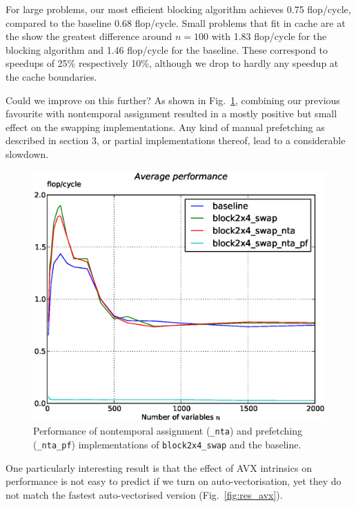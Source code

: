 \documentclass[letterpaper]{article}
\begin{document}
For large problems, our most efficient blocking algorithm achieves 0.75 flop/cycle, compared to the baseline 0.68 flop/cycle.
Small problems that fit in cache are at the show the greatest difference around $n=100$ with 1.83 flop/cycle for the blocking algorithm and 1.46 flop/cycle for the baseline.
These correspond to speedups of 25\% respectively 10\%, although we drop to hardly any speedup at the cache boundaries.

Could we improve on this further?
As shown in Fig.~\ref{fig:res_cachecontrol}, combining our previous favourite with nontemporal assignment resulted in a mostly positive but small effect on the swapping implementations.
Any kind of manual prefetching as described in section 3, or partial implementations thereof, lead to a considerable slowdown.

\begin{figure}\centering
  \includegraphics[scale=0.4]{img/results_cachecontrol_novec.eps}
  \caption{Performance of nontemporal assignment ({\tt \_nta}) and prefetching ({\tt \_nta\_pf}) implementations of {\tt block2x4\_swap} and the baseline.\label{fig:res_cachecontrol}}
\end{figure}

One particularly interesting result is that the effect of AVX intrinsics on performance is not easy to predict if we turn on auto-vectorisation,
yet they do not match the fastest auto-vectorised version (Fig.~\ref{fig:res_avx}).
\end{document}
